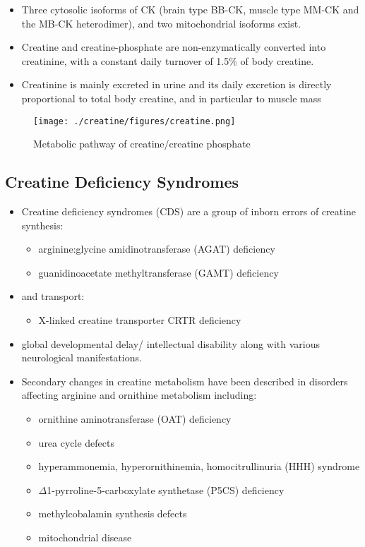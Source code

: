 \documentclass{scrartcl}
\begin{document}
\begin{itemize}
\item Three cytosolic isoforms of CK (brain type BB-CK, muscle type MM-CK
and the MB-CK heterodimer), and two mitochondrial isoforms exist.

\item Creatine and creatine-phosphate are non-enzymatically converted into
creatinine, with a constant daily turnover of 1.5\% of body
creatine.

\item Creatinine is mainly excreted in urine and its daily excretion is
directly proportional to total body creatine, and in particular to
muscle mass
\end{itemize}

\begin{figure}[htbp]
\centering
\texttt{[image: ./creatine/figures/creatine.png]}
\caption{\label{fig:orgc0f3434}
Metabolic pathway of creatine/creatine phosphate}
\end{figure}


\subsection{Creatine Deficiency Syndromes}
\label{sec:org5810e74}
\begin{itemize}
\item Creatine deficiency syndromes (CDS) are a group of inborn errors of
creatine synthesis:
\begin{itemize}
\item arginine:glycine amidinotransferase (AGAT) deficiency
\item guanidinoacetate methyltransferase (GAMT) deficiency
\end{itemize}
\item and transport:
\begin{itemize}
\item X-linked creatine transporter CRTR deficiency
\end{itemize}
\item global developmental delay/ intellectual disability along with
various neurological manifestations.

\item Secondary changes in creatine metabolism have been described in
disorders affecting arginine and ornithine metabolism including:
\begin{itemize}
\item ornithine aminotransferase (OAT) deficiency
\item urea cycle defects
\item hyperammonemia, hyperornithinemia, homocitrullinuria (HHH) syndrome
\item \(\Delta\)1-pyrroline-5-carboxylate synthetase (P5CS) deficiency
\item methylcobalamin synthesis defects
\item mitochondrial disease
\end{itemize}
\end{itemize}
\end{document}
